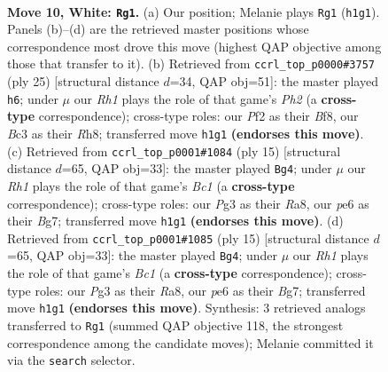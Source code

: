 \documentclass[11pt]{article}
\begin{document}
\clearpage

\begin{figure}[p]\centering
\begin{subfigure}{0.46\textwidth}\centering
\resizebox{\linewidth}{!}{%
\newchessgame
\chessboard[
  setfen={1rb2rk1/p1ppqppp/2n1pn2/1pP5/3P4/2B1PNP1/PP3P1P/R2QKB1R w KQ b6 0 10},
  showmover=false,
  pgfstyle=straightmove, color=movearrow, markmove={h1-g1}
]}
\caption{}
\end{subfigure}\hfill
\begin{subfigure}{0.46\textwidth}\centering
\resizebox{\linewidth}{!}{%
\newchessgame
\chessboard[
  setfen={r2qkb1r/1p2np1p/p1b1p1p1/3pP3/P2P4/2N2N2/1P3PPP/R1BQ1RK1 b kq - 0 13},
  showmover=false,
  pgfstyle=straightmove, color=movearrow, markmove={h7-h6}
]}
\caption{}
\end{subfigure}
\\[4pt]
\begin{subfigure}{0.46\textwidth}\centering
\resizebox{\linewidth}{!}{%
\newchessgame
\chessboard[
  setfen={r1bqk2r/1p2ppbp/p1p2np1/2p5/4P3/2PP1N2/PP2QPPP/RNB2RK1 b kq - 2 8},
  showmover=false,
  pgfstyle=straightmove, color=movearrow, markmove={c8-g4}
]}
\caption{}
\end{subfigure}\hfill
\begin{subfigure}{0.46\textwidth}\centering
\resizebox{\linewidth}{!}{%
\newchessgame
\chessboard[
  setfen={r1bqk2r/1p2ppbp/p1p2np1/2p5/4P3/2PP1N2/PP2QPPP/RNB2RK1 b kq - 2 8},
  showmover=false,
  pgfstyle=straightmove, color=movearrow, markmove={c8-g4}
]}
\caption{}
\end{subfigure}
\caption{\textbf{Move 10, White: \texttt{Rg1}.} (a) Our position; Melanie plays \texttt{Rg1} (\texttt{h1g1}). Panels (b)--(d) are the retrieved master positions whose correspondence most drove this move (highest QAP objective among those that transfer to it). (b) Retrieved from \texttt{ccrl\_top\_p0000\#3757} (ply 25) [structural distance $d$=34, QAP obj=51]: the master played \texttt{h6}; under $\mu$ our \emph{Rh1} plays the role of that game's \emph{Ph2} (a \textbf{cross-type} correspondence); cross-type roles: our \emph{P}f2 as their \emph{B}f8, our \emph{B}c3 as their \emph{R}h8; transferred move \texttt{h1g1} \textbf{(endorses this move)}. (c) Retrieved from \texttt{ccrl\_top\_p0001\#1084} (ply 15) [structural distance $d$=65, QAP obj=33]: the master played \texttt{Bg4}; under $\mu$ our \emph{Rh1} plays the role of that game's \emph{Bc1} (a \textbf{cross-type} correspondence); cross-type roles: our \emph{P}g3 as their \emph{R}a8, our \emph{p}e6 as their \emph{B}g7; transferred move \texttt{h1g1} \textbf{(endorses this move)}. (d) Retrieved from \texttt{ccrl\_top\_p0001\#1085} (ply 15) [structural distance $d$=65, QAP obj=33]: the master played \texttt{Bg4}; under $\mu$ our \emph{Rh1} plays the role of that game's \emph{Bc1} (a \textbf{cross-type} correspondence); cross-type roles: our \emph{P}g3 as their \emph{R}a8, our \emph{p}e6 as their \emph{B}g7; transferred move \texttt{h1g1} \textbf{(endorses this move)}. Synthesis: 3 retrieved analogs transferred to \texttt{Rg1} (summed QAP objective 118, the strongest correspondence among the candidate moves); Melanie committed it via the \texttt{search} selector.}

\end{figure}
\end{document}
